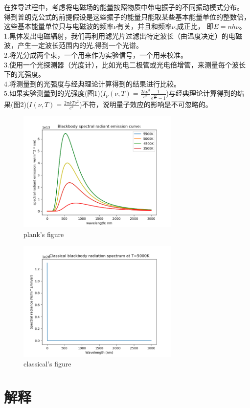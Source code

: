 \documentclass[12pt, a4paper, oneside]{article}
\begin{document}
\begin{spacing}{2.0}
{\color{red}在推导过程中，考虑将电磁场的能量按照物质中带电振子的不同振动模式分布。
得到普朗克公式的前提假设是这些振子的能量只能取某些基本能量单位的整数倍，这些基本能量单位只与电磁波的频率$\nu $有关，并且和频率$\nu$,成正比，
即$E = n h \nu$。}
1.黑体发出电磁辐射，我们再利用滤光片过滤出特定波长（由温度决定）的电磁波，产生一定波长范围内的光,得到一个光谱。\\
2.将光分成两个束，一个用来作为实验信号，一个用来校准。\\
3.使用一个光探测器（光度计），比如光电二极管或光电倍增管，来测量每个波长下的光强度。\\
4.将测量到的光强度与经典理论计算得到的结果进行比较。\\
5.如果实验测量到的光强度(图1)($I_{\nu}(\nu,T) =\frac{2  h\nu^{3}}{c^2}\frac{1}{e^{\frac{h\nu}{kT}} - 1}$)与经典理论计算得到的结果(图2)($I(\nu, T) = \frac{2 \pi k T \nu^2}{c^2}$)不符，说明量子效应的影响是不可忽略的。
\begin{figure}[H]
	\centering
	\includegraphics[width=8cm]{Figure_1.png}
	\caption{plank's figure}
\end{figure}
\begin{figure}[H]
	\centering
	\includegraphics[width=8cm]{Figure_2.png}
	\caption{classical's figure}
\end{figure}

\section[short]{解释}


\end{spacing}
\end{document}
